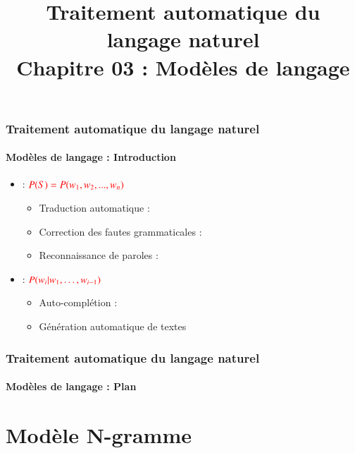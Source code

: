 \documentclass[xcolor=table]{beamer}
\title[TALN : 03- Modèles de langage]%
{Traitement automatique du langage naturel\\Chapitre 03 : Modèles de langage}
\begin{document}
	
\begin{frame}
\frametitle{Traitement automatique du langage naturel}
\framesubtitle{Modèles de langage : Introduction}

\begin{itemize}
	\item {} : $\color{red} P(S) = P(w_1, w_2, ..., w_n) $
	\begin{itemize}
		\item Traduction automatique : \\
		\item Correction des fautes grammaticales : \\
		\item Reconnaissance de paroles : \\
	\end{itemize}
	\item {} : $\color{red} P(w_i | w_1, \ldots, w_{i-1}) $
	\begin{itemize}
		\item Auto-complétion : \\
		\item Génération automatique de textes
	\end{itemize}
\end{itemize}

\end{frame}


\begin{frame}
\frametitle{Traitement automatique du langage naturel}
\framesubtitle{Modèles de langage : Plan}

\begin{multicols}{2}
\tableofcontents
\end{multicols}
\end{frame}

\section{Modèle N-gramme}
\end{document}
